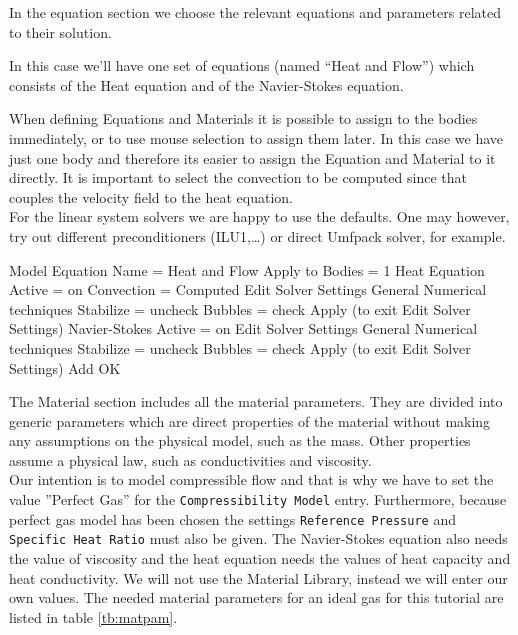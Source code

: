 In the equation section we choose the relevant equations and parameters related to their solution. 

In this case we'll have one set of equations (named ``Heat and Flow'') which consists of the Heat equation and of the Navier-Stokes equation.

When defining Equations and Materials it is possible to assign to the bodies immediately, or to use mouse selection to assign them later. In this case we have just one body and therefore its easier to assign the Equation and Material to it directly.  It is important to select the convection to be computed since that couples the velocity field to the heat equation.\\

For the linear system solvers we are happy to use the defaults. One may however, try out different preconditioners (ILU1,\ldots) or direct Umfpack solver, for example.

\ttbegin
Model
  Equation
   Name = Heat and Flow
    Apply to Bodies = 1
    Heat Equation
      Active = on
      Convection = Computed
        Edit Solver Settings
           General
             Numerical techniques
                Stabilize = uncheck
                Bubbles  = check
          Apply (to exit Edit Solver Settings)
    Navier-Stokes
      Active = on
        Edit Solver Settings
           General
             Numerical techniques
                Stabilize = uncheck
                Bubbles  = check
          Apply (to exit Edit Solver Settings)
    Add 
    OK
\ttend        

The Material section includes all the material parameters. They are divided into generic parameters which are direct properties of the material without making any assumptions on the physical model, such as the mass. Other properties assume a physical law, such as conductivities and viscosity.\\

Our intention is to model compressible flow and that is why we have to set the value ''Perfect Gas'' for the {\tt Compressibility Model} entry. Furthermore, because perfect gas model has been chosen the settings {\tt Reference Pressure} and {\tt Specific Heat Ratio} must also be given. The Navier-Stokes equation also needs the value of viscosity and the heat equation needs the values of heat capacity and heat conductivity.  We will not use the Material Library, instead we will enter our own values.  The needed material parameters for an ideal gas for this tutorial are listed in table \ref{tb:matpam}.


